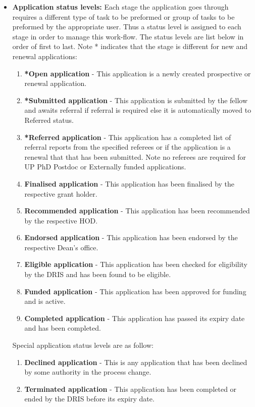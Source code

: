 \documentclass[12pt]{article}
\begin{document}
	
	\begin{itemize}
		\item\textbf{Application status levels:} Each stage the application goes through requires a different type of task to be preformed or group of tasks to be preformed by the appropriate user. Thus a status level is assigned to each stage in order to manage this work-flow. The status levels are list below in order of first to last. Note * indicates that the stage is different for new and renewal applications: 
		\begin{enumerate}
			\item \textbf{*Open application} - This application is a newly created prospective or renewal application.
			\item \textbf{*Submitted application} - This application is submitted by the fellow and awaits referral if referral is required else it is automatically moved to Referred status.
			\item \textbf{*Referred application} - This application has a completed list of referral reports from the specified referees or if the application is a renewal that that has been submitted. Note no referees are required for UP PhD Postdoc or Externally funded applications. 
			\item \textbf{Finalised application} - This application has been finalised by the respective grant holder.
			\item \textbf{Recommended application} - This application has been recommended by the respective HOD.
			\item \textbf{Endorsed application} - This application has been endorsed by the respective Dean's office.
			\item \textbf{Eligible application} - This application has been checked for eligibility by the DRIS and has been found to be eligible.
			\item \textbf{Funded application} - This application has been approved for funding and is active.
			\item \textbf{Completed application} - This application has passed its expiry date and has been completed.			
		\end{enumerate}
		Special application status levels are as follow:
		\begin{enumerate}
			\item \textbf{Declined application} - This is any application that has been declined by some authority in the process change.
			\item \textbf{Terminated application} - This application has been completed or ended by the DRIS before its expiry date.	

\end{enumerate}
\end{itemize}
\end{document}

